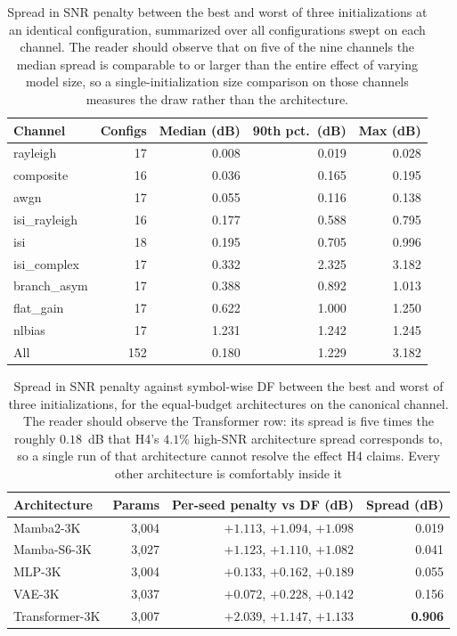 \begin{table}[htbp]
\centering
\caption[Across-initialization spread]{Spread in SNR penalty between the best and worst of three initializations at an identical configuration, summarized over all configurations swept on each channel. The reader should observe that on five of the nine channels the median spread is comparable to or larger than the entire effect of varying model size, so a single-initialization size comparison on those channels measures the draw rather than the architecture.}\label{tbl:seed-spread}
\begin{tabular}{lrrrr}
\toprule
Channel & Configs & Median (dB) & 90th pct.\ (dB) & Max (dB) \\
\midrule
rayleigh      & 17 & 0.008 & 0.019 & 0.028 \\
composite     & 16 & 0.036 & 0.165 & 0.195 \\
awgn          & 17 & 0.055 & 0.116 & 0.138 \\
isi\_rayleigh & 16 & 0.177 & 0.588 & 0.795 \\
isi           & 18 & 0.195 & 0.705 & 0.996 \\
isi\_complex  & 17 & 0.332 & 2.325 & 3.182 \\
branch\_asym  & 17 & 0.388 & 0.892 & 1.013 \\
flat\_gain    & 17 & 0.622 & 1.000 & 1.250 \\
nlbias        & 17 & 1.231 & 1.242 & 1.245 \\
\midrule
All           & 152 & 0.180 & 1.229 & 3.182 \\
\bottomrule
\end{tabular}
\end{table}

\begin{table}[htbp]
\centering
\caption[Across-initialization spread at the 3K budget]{Spread in SNR penalty against symbol-wise DF between the best and worst of three initializations, for the equal-budget architectures on the canonical channel. The reader should observe the Transformer row: its spread is five times the roughly $0.18$~dB that H4's $4.1\%$ high-SNR architecture spread corresponds to, so a single run of that architecture cannot resolve the effect H4 claims. Every other architecture is comfortably inside it}\label{tbl:seed-spread-3k}
\begin{tabular}{lrrr}
\toprule
Architecture & Params & Per-seed penalty vs DF (dB) & Spread (dB) \\
\midrule
Mamba2-3K       & 3{,}004 & $+1.113$, $+1.094$, $+1.098$ & 0.019 \\
Mamba-S6-3K     & 3{,}027 & $+1.123$, $+1.110$, $+1.082$ & 0.041 \\
MLP-3K          & 3{,}004 & $+0.133$, $+0.162$, $+0.189$ & 0.055 \\
VAE-3K          & 3{,}037 & $+0.072$, $+0.228$, $+0.142$ & 0.156 \\
Transformer-3K  & 3{,}007 & $+2.039$, $+1.147$, $+1.133$ & \textbf{0.906} \\
\bottomrule
\end{tabular}
\end{table}

